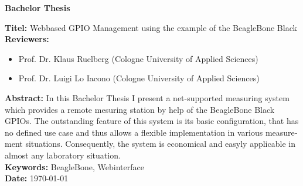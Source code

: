 \begin{otherlanguage}{english}

\begin{center}
	\textbf{Bachelor Thesis}
\end{center}

\noindent \textbf{Titel:} Webbased GPIO Management using the example of the BeagleBone Black\\

\noindent \textbf{Reviewers:}
\begin{itemize}
	\item Prof. Dr. Klaus Ruelberg (Cologne University of Applied Sciences)
	\item Prof. Dr. Luigi Lo Iacono (Cologne University of Applied Sciences)
\end{itemize}

\noindent \textbf{Abstract:} In this Bachelor Thesis I present a net-supported measuring system which provides a remote mesuring station by help of the BeagleBone Black GPIOs. The outstanding feature of this system is its basic configuration, that has no defined use case and thus allows a flexible implementation in various measurement situations. Consequently, the system is economical and easyly applicable in almost any laboratory situation.\\

\noindent \textbf{Keywords:} BeagleBone, Webinterface\\
\noindent \textbf{Date:} {\longdate \today}

\end{otherlanguage}